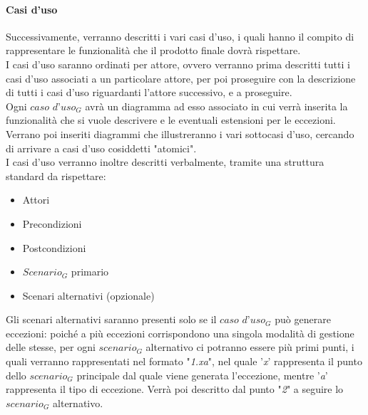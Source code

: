 \paragraph{Casi d'uso}
Successivamente, verranno descritti i vari casi d'uso, i quali hanno il compito di rappresentare le funzionalità che il prodotto finale dovrà rispettare. \\
I casi d'uso saranno ordinati per attore, ovvero verranno prima descritti tutti i casi d'uso associati a un particolare attore, per poi proseguire con la descrizione di tutti i casi d'uso riguardanti l'attore successivo, e a proseguire. \\
Ogni $\textit{caso d'uso}_G$ avrà un diagramma ad esso associato in cui verrà inserita la funzionalità che si vuole descrivere e le eventuali estensioni per le eccezioni. Verrano poi inseriti diagrammi che illustreranno i vari sottocasi d'uso, cercando di arrivare a casi d'uso cosiddetti "atomici". \\
I casi d'uso verranno inoltre descritti verbalmente, tramite una struttura standard da rispettare:
\begin{itemize}
    \item Attori
    \item Precondizioni
    \item Postcondizioni
    \item $\textit{Scenario}_G$ primario
    \item Scenari alternativi (opzionale)
\end{itemize}
\begin{comment}
I $\textit{sottocasi d'uso}_G$ non verranno descritti individualmente, poiché sarà già tutto descritto a livello atomico nello $\textit{scenario}_G$ principale del relativo $\textit{caso d'uso}_G$ "padre".
\end{comment}
Gli scenari alternativi saranno presenti solo se il $\textit{caso d'uso}_G$ può generare eccezioni: poiché a più eccezioni corrispondono una singola modalità di gestione delle stesse, per ogni $\textit{scenario}_G$ alternativo ci potranno essere più primi punti, i quali verranno rappresentati nel formato "\textit{1.xa}", nel quale '\textit{x}' rappresenta il punto dello $\textit{scenario}_G$ principale dal quale viene generata l'eccezione, mentre '\textit{a}' rappresenta il tipo di eccezione. Verrà poi descritto dal punto "\textit{2}" a seguire lo $\textit{scenario}_G$ alternativo.
